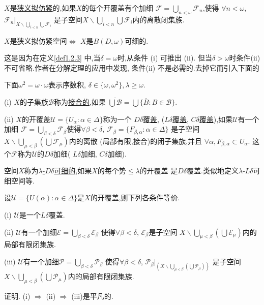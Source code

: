 \documentclass[main.tex]{subfiles}
\begin{document}
\begin{definition}
	$X$是\underline{狭义拟仿紧}的,如果$X$的每个开覆盖有个加细
	$\mathscr{F}=\bigcup_{n<\omega}\mathscr{F}_n$,使得
	$\forall n < \omega$, $\mathscr{F}_n|_{X\backslash\bigcup_{i<n}\bigcup\mathscr{F}_i}$
	是子空间$X\backslash\bigcup_{i<n}\bigcup\mathscr{F}_i$内的离散闭集族.
\end{definition}

\begin{fact}
	$X$是狭义拟仿紧空间$\Leftrightarrow$ $X$是$B(D,\omega)$可细的.
\end{fact}

这是因为在定义\ref{def1.2.3} 中,当$\delta=\omega$时,从条件 (i) 可推出 (ii).
但当$\delta>\omega$时条件(ii) 不可省略.作者在分解定理的应用中发现,
条件(ii) 不是必需的.去掉它而引入下面的

\begin{definition}\label{def1.2.5}
	下面$\omega^2=\omega\cdot\omega$表示序数积, $\delta\in\{\omega,\omega^2\}, \lambda\ge\omega$.
	
	\textnormal{(i)} $X$的子集族$\mathscr{B}$称为\underline{接合的},如果
	$\overline{\bigcup\mathscr{B}}=\bigcup\{\overline{B}: B\in\mathscr{B}\}$.
	
	\textnormal{(ii)} $X$的开覆盖$\mathscr{U}=\{U_\alpha:\alpha\in\Delta\}$称为一个
	\underline{$D\delta$覆盖}, \textnormal{(}\underline{$L\delta$覆盖}, 
	\underline{$C\delta$覆盖}\textnormal{)},如果$\mathscr{U}$有一个加细
   $\mathscr{F}=\bigcup_{\beta<\delta}\mathscr{F}_\beta$使得$\forall\beta<\delta$,
   $\mathscr{F}_\beta=\{F_{\beta,\alpha}: \alpha\in\Delta\}$
   是子空间$X\backslash\bigcup_{\mu<\beta}(\bigcup\mathscr{F}_\mu)$内的离散
   \textnormal{(}局部有限,接合\textnormal{)}的闭子集族,并且
   	$\forall\alpha, F_{\beta,\alpha}\subset U_\alpha$.
   	这个$\mathscr{F}$称为$\mathscr{U}$的$D\delta$加细\textnormal{(}
   	$L\delta$加细, $C\delta$加细\textnormal{)}.
   	
   	空间$X$称为\underline{$\lambda$-$D\delta$可细的},如果$X$的每个势$\le\lambda$的开覆盖
   	是$D\delta$覆盖.类似地定义$\lambda$-$L\delta$可细空间等.
\end{definition}

\begin{proposition}
	设$\mathscr{U}=\{U(\alpha): \alpha\in\Delta\}$是$X$的开覆盖,则下列各条件等价.
	
	\textnormal{(i)} $\mathscr{U}$是一个$L\delta$覆盖.
	
	\textnormal{(ii)}  $\mathscr{U}$有一个加细$\mathscr{E}=\bigcup_{\beta<\delta}\mathscr{E}_\beta$
	使得$\forall\beta<\delta$, $\mathscr{E}_\beta$是子空间
	$X\backslash\bigcup_{\mu<\beta}(\bigcup\mathscr{E}_\mu)$内的局部有限闭集族.
	
	\textnormal{(iii)} $\mathscr{U}$有一个加细$\mathscr{P}=\bigcup_{\beta<\delta}\mathscr{P}_\beta$
	使得$\forall\beta<\delta$, $\mathscr{P}_\beta|_{(X\backslash\bigcup_{\mu<\beta}(\bigcup\mathscr{P}_\mu))}$
	是子空间
	$X\backslash\bigcup_{\mu<\beta}(\bigcup\mathscr{P}_\mu)$内的局部有限闭集族.
\end{proposition}
证明. (i) $\Rightarrow$ (ii) $\Rightarrow$ (iii)是平凡的.
\end{document}

